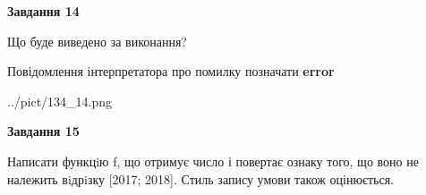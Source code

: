 \documentclass[11pt, ukrainian]{article}
\begin{document}
{\begin {large}
{\begin {center}\textbf{Завдання 14}\end {center}}\par
Що буде виведено за виконання? \par
Повідомлення інтерпретатора про помилку позначати \textbf{error}

\begin{center}
	{../pict/134_14.png}
\end{center}
\newpage

{\begin {center}\textbf{Завдання 15}\end {center}}\par

Написати функцiю f, що отримує число і повертає ознаку того, що воно не належить вiдрiзку [2017; 2018]. Стиль запису умови також оцінюється.\par
\newpage

\end {large}}
\end{document}
